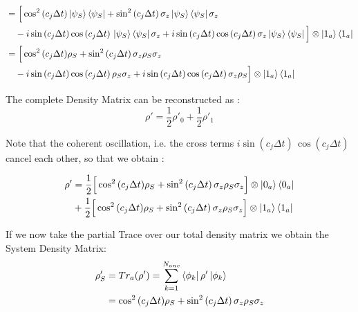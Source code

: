 \documentclass[a4paper,12pt]{article}
\begin{document}
\begin{align}
		&= \Big [ \cos^{2}{\left(c_{j} \Delta t\right)} \ket{\psi_S}\bra{\psi_S} + \sin^{2}{\left(c_{j} \Delta t\right)} \, \sigma_{z} \ket{\psi_S}\bra{\psi_S} \sigma_{z} \notag \\
		& \quad - i \sin{\left(c_{j} \Delta t \right)} \cos{\left(c_{j} \Delta t\right)} \,  \ket{\psi_S}\bra{\psi_S} \sigma_{z} + i \sin{\left(c_{j} \Delta t \right)} \cos{\left(c_{j} \Delta t\right)} \, \sigma_{z} \ket{\psi_S}\bra{\psi_S}  \Big] \otimes \ket{1_a}\bra{1_a} \notag \\
		&= \Big [ \cos^{2}{\left(c_{j} \Delta t\right)} \rho_S + \sin^{2}{\left(c_{j} \Delta t\right)} \, \sigma_{z} \rho_S \sigma_{z} \notag \\
		& \quad - i \sin{\left(c_{j} \Delta t \right)} \cos{\left(c_{j} \Delta t\right)} \, \rho_S \sigma_{z} + i \sin{\left(c_{j} \Delta t \right)} \cos{\left(c_{j} \Delta t\right)} \, \sigma_{z} \rho_S \Big] \otimes \ket{1_a}\bra{1_a}
		\label{eq:rho_0_1_reconstruction}
	\end{align}

	The complete Density Matrix can be reconstructed as :
	\begin{equation}
		\rho' = \frac{1}{2} \rho'_{0} + \frac{1}{2} \rho'_{1}
		\label{eq:rho_complete_reconstruction}
	\end{equation}

	Note that the coherent oscillation, i.e. the cross terms $ i \sin{\left(c_{j} \Delta t\right)} \, \cos{\left(c_{j} \Delta t\right)} $ cancel each other, so that we obtain :

	\begin{align}
		\rho' &= \frac{1}{2} \Big[ \cos^{2}{\left(c_{j} \Delta t\right)} \rho_S + \sin^{2}{\left(c_{j} \Delta t\right)} \, \sigma_{z} \rho_S \sigma_{z} \Big] \otimes \ket{0_a}\bra{0_a} \notag \\
		& + \frac{1}{2} \Big[ \cos^{2}{\left(c_{j} \Delta t\right)} \rho_S + \sin^{2}{\left(c_{j} \Delta t\right)} \, \sigma_{z} \rho_S \sigma_{z} \Big] \otimes \ket{1_a}\bra{1_a}
		\label{eq:rho_complete_explicit}
	\end{align}

	If we now take the partial Trace over our total density matrix we obtain the System Density Matrix:
	\begin{align}
		\rho'_S & = Tr_a(\rho') = \sum_{k=1}^{N_{anc}}{\bra{\phi_k}\rho'\ket{\phi_k}} \notag \\
		&= \cos^{2}{\left(c_{j} \Delta t\right)} \rho_S + \sin^{2}{\left(c_{j} \Delta t\right)} \, \sigma_{z} \rho_S \sigma_{z}
		\label{eq:rho_s_partial_trace_diff}
	\end{align}
\end{document}
